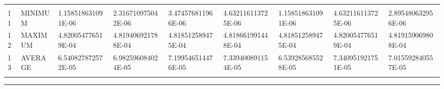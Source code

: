 \begin{landscape}
\begin{table}[ht]
{\begin{tabular}{ p{0.4cm} p{4.00cm} p{4.00cm} p{4.0cm} p{4.00cm} p{4.00cm} p{4.0cm} p{4.00cm} p{4.00cm} }
	&		&		&		&		&		&		&		&		\\
11	&	MINIMUM			&	1.158518631091E-06	&	2.316710975042E-06	&	3.474576811966E-06	&	4.632116113725E-06	&	1.158518631091E-06	&	4.632116113725E-06	&	2.895480632956E-06	\\
12	&	MAXIMUM			&	4.820054776519E-04	&	4.819406921788E-04	&	4.818512589475E-04	&	4.818661991448E-04	&	4.818512589475E-04	&	4.820054776519E-04	&	4.819159069808E-04	\\
13	&	AVERAGE			&	6.540827872572E-05	&	6.982596084024E-05	&	7.199546514476E-05	&	7.339400891154E-05	&	6.539285685528E-05	&	7.340951921751E-05	&	7.015592840557E-05	\\
	&		&		&		&		&		&		&		&		
		
\end{tabular}
			
			
}   %
\hrule
\end{table}
\end{landscape}




